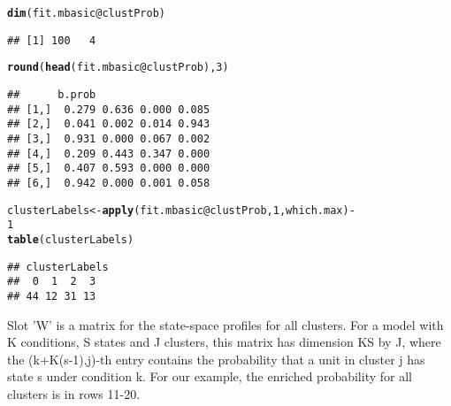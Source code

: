 \documentclass[a4paper,10pt]{article}\usepackage[]{graphicx}\usepackage[]{color}
\makeatletter
\newcommand{\hlnum}[1]{\textcolor[rgb]{0.686,0.059,0.569}{#1}}%
\newcommand{\hlopt}[1]{\textcolor[rgb]{0,0,0}{#1}}%
\newcommand{\hlstd}[1]{\textcolor[rgb]{0.345,0.345,0.345}{#1}}%
\newcommand{\hlkwb}[1]{\textcolor[rgb]{0.69,0.353,0.396}{#1}}%
\newcommand{\hlkwc}[1]{\textcolor[rgb]{0.333,0.667,0.333}{#1}}%
\newcommand{\hlkwd}[1]{\textcolor[rgb]{0.737,0.353,0.396}{\textbf{#1}}}%
\newenvironment{kframe}{%
 \def\at@end@of@kframe{}%
 \ifinner\ifhmode%
  \def\at@end@of@kframe{\end{minipage}}%
  \begin{minipage}{\columnwidth}%
 \fi\fi%
 \def\FrameCommand##1{\hskip\@totalleftmargin \hskip-\fboxsep
 \colorbox{shadecolor}{##1}\hskip-\fboxsep
     \hskip-\linewidth \hskip-\@totalleftmargin \hskip\columnwidth}%
 \MakeFramed {\advance\hsize-\width
   \@totalleftmargin\z@ \linewidth\hsize
   \@setminipage}}%
 {\par\unskip\endMakeFramed%
 \at@end@of@kframe}
\newenvironment{knitrout}{}{} %
\makeatother
\begin{document}
\begin{knitrout}
\color{fgcolor}\begin{kframe}
\begin{alltt}
\hlkwd{dim}\hlstd{(fit.mbasic}\hlopt{@}\hlkwc{clustProb}\hlstd{)}
\end{alltt}
\begin{verbatim}
## [1] 100   4
\end{verbatim}
\begin{alltt}
\hlkwd{round}\hlstd{(}\hlkwd{head}\hlstd{(fit.mbasic}\hlopt{@}\hlkwc{clustProb}\hlstd{),} \hlnum{3}\hlstd{)}
\end{alltt}
\begin{verbatim}
##      b.prob                  
## [1,]  0.279 0.636 0.000 0.085
## [2,]  0.041 0.002 0.014 0.943
## [3,]  0.931 0.000 0.067 0.002
## [4,]  0.209 0.443 0.347 0.000
## [5,]  0.407 0.593 0.000 0.000
## [6,]  0.942 0.000 0.001 0.058
\end{verbatim}
\begin{alltt}
\hlstd{clusterLabels} \hlkwb{<-} \hlkwd{apply}\hlstd{(fit.mbasic}\hlopt{@}\hlkwc{clustProb}\hlstd{,} \hlnum{1}\hlstd{, which.max)} \hlopt{-}
    \hlnum{1}
\hlkwd{table}\hlstd{(clusterLabels)}
\end{alltt}
\begin{verbatim}
## clusterLabels
##  0  1  2  3 
## 44 12 31 13
\end{verbatim}
\end{kframe}
\end{knitrout}

Slot 'W' is a matrix for the state-space profiles for all clusters. For a model with K conditions, S states and J clusters, this matrix has dimension KS by J, where the (k+K(s-1),j)-th entry contains the probability that a unit in cluster j has state s under condition k. For our example, the enriched probability for all clusters is in rows 11-20.
\end{document}
